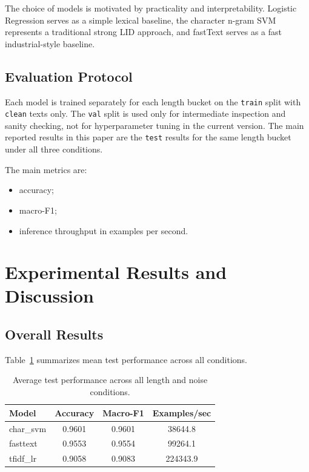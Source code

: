 \documentclass[conference]{IEEEtran}
\begin{document}
The choice of models is motivated by practicality and interpretability. Logistic Regression serves as a simple lexical baseline, the character n-gram SVM represents a traditional strong LID approach, and fastText serves as a fast industrial-style baseline.

\subsection{Evaluation Protocol}

Each model is trained separately for each length bucket on the \texttt{train} split with \texttt{clean} texts only. The \texttt{val} split is used only for intermediate inspection and sanity checking, not for hyperparameter tuning in the current version. The main reported results in this paper are the \texttt{test} results for the same length bucket under all three conditions.

The main metrics are:

\begin{itemize}
    \item accuracy;
    \item macro-F1;
    \item inference throughput in examples per second.
\end{itemize}

\section{Experimental Results and Discussion}
\label{sec:results}

\subsection{Overall Results}

Table~\ref{tab:overall} summarizes mean test performance across all conditions.

\begin{table}[!t]
\centering
\caption{Average test performance across all length and noise conditions.}
\label{tab:overall}
\begin{tabular}{lccc}
\toprule
Model & Accuracy & Macro-F1 & Examples/sec \\
\midrule
char\_svm & 0.9601 & 0.9601 & 38644.8 \\
fasttext & 0.9553 & 0.9554 & 99264.1 \\
tfidf\_lr & 0.9058 & 0.9083 & 224343.9 \\
\bottomrule
\end{tabular}
\end{table}
\end{document}
